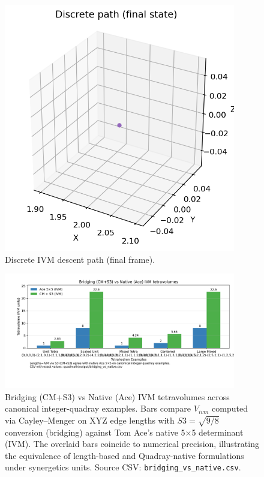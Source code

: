 \documentclass[
  10pt,
]{article}
\begin{document}
\begin{figure}[htbp]
\centering
\includegraphics[width=0.9\textwidth]{figures/discrete_path_final.png}
\caption{Discrete IVM descent path (final frame).}
\label{fig:discrete_path}
\end{figure}

\begin{figure}[htbp]
\centering
\includegraphics[width=0.9\textwidth]{figures/bridging_vs_native.png}
\caption{Bridging (CM+S3) vs Native (Ace) IVM tetravolumes across canonical integer-quadray examples. Bars compare $V_{ivm}$ computed via Cayley–Menger on XYZ edge lengths with $S3=\sqrt{9/8}$ conversion (bridging) against Tom Ace's native 5×5 determinant (IVM). The overlaid bars coincide to numerical precision, illustrating the equivalence of length-based and Quadray-native formulations under synergetics units. Source CSV: \texttt{bridging\_vs\_native.csv}.}
\label{fig:bridging_native_eq_appendix}
\end{figure}
\end{document}
